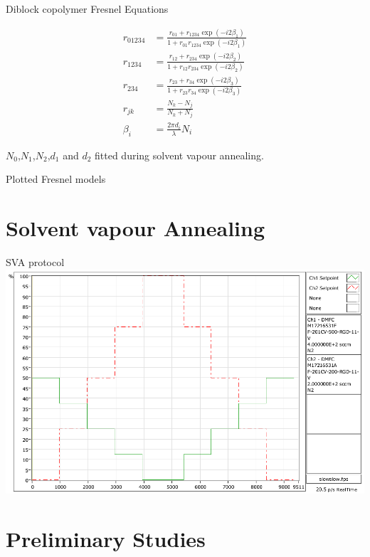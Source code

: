 \documentclass[10pt]{beamer}
\begin{document}
\begin{frame}{Diblock copolymer Fresnel Equations}

\begin{align*}
r_{01234}&= \frac{r_{01}+r_{1234}\exp(-i2\beta_1)}{1+r_{01}r_{1234}\exp(-i2\beta_1)} \\
r_{1234} &= \frac{r_{12}+r_{234}\exp(-i2\beta_2)}{1+r_{12}r_{234}\exp(-i2\beta_2)} \\
r_{234}  &= \frac{r_{23}+r_{34}\exp(-i2\beta_3)}{1+r_{23}r_{34}\exp(-i2\beta_3)} \\
r_{jk}   &= \frac{N_k-N_j}{N_k + N_j}\\  
\beta_i  &= \frac{2\pi d_i}{\lambda}N_i
\end{align*}

$N_0$,$N_1$,$N_2$,$d_1$ and $d_2$ fitted during solvent vapour annealing.
\end{frame}

\begin{frame}{Plotted Fresnel models}

\end{frame}	

	\section{Solvent vapour Annealing}
\begin{frame}{SVA protocol}
\includegraphics[width=\textwidth]{slowslowprotocol.png}
\end{frame}


	\section{Preliminary Studies}
	
\end{document}
